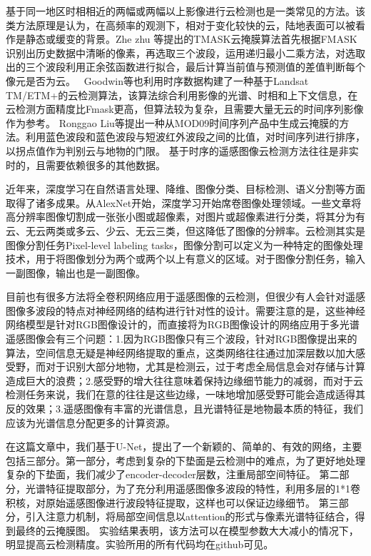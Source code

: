 \documentclass[UTF8]{ctexart}
\begin{document}
基于同一地区时相相近的两幅或两幅以上影像进行云检测也是一类常见的方法。该类方法原理是认为，在高频率的观测下，相对于变化较快的云，陆地表面可以被看作是静态或缓变的背景。Zhe zhu 等\cite{zhu2014automated}提出的TMASK云掩膜算法首先根据FMASK识别出历史数据中清晰的像素，再选取三个波段，运用递归最小二乘方法，对选取出的三个波段利用正余弦函数进行拟合，最后计算当前值与预测值的差值判断每个像元是否为云。 
Goodwin等\cite{goodwin2013cloud}也利用时序数据构建了一种基于Landsat TM/ETM+的云检测算法，该算法综合利用影像的光谱、时相和上下文信息，在云检测方面精度比Fmask更高，但算法较为复杂，且需要大量无云的时间序列影像作为参考。
Ronggao Liu等\cite{liu2013generation}提出一种从MOD09时间序列产品中生成云掩膜的方法。利用蓝色波段和蓝色波段与短波红外波段之间的比值，对时间序列进行排序，以拐点值作为判别云与地物的门限。
基于时序的遥感图像云检测方法往往是非实时的，且需要依赖很多的其他数据。

近年来，深度学习在自然语言处理、降维、图像分类、目标检测、语义分割等方面取得了诸多成果。从AlexNet开始，深度学习开始席卷图像处理领域。一些文章将高分辨率图像切割成一张张小图或超像素，对图片或超像素进行分类，将其分为有云、无云两类或多云、少云、无云三类，但这降低了图像的分辨率。云检测其实是图像分割任务Pixel-level labeling tasks，图像分割可以定义为一种特定的图像处理技术，用于将图像划分为两个或两个以上有意义的区域。对于图像分割任务，输入一副图像，输出也是一副图像。

目前也有很多方法将全卷积网络应用于遥感图像的云检测\cite{chai2019cloud, jeppesen2019cloud}，但很少有人会针对遥感图像多波段的特点对神经网络的结构进行针对性的设计。需要注意的是，这些神经网络模型是针对RGB图像设计的，而直接将为RGB图像设计的网络应用于多光谱遥感图像会有三个问题：1.因为RGB图像只有三个波段，针对RGB图像提出来的算法，空间信息无疑是神经网络提取的重点，这类网络往往通过加深层数以加大感受野，而对于识别大部分地物，尤其是检测云，过于考虑全局信息会对存储与计算造成巨大的浪费；2.感受野的增大往往意味着保持边缘细节能力的减弱，而对于云检测任务来说，我们在意的往往是这些边缘，一味地增加感受野可能会造成适得其反的效果；3.遥感图像有丰富的光谱信息，且光谱特征是地物最本质的特征，我们应该为光谱信息分配更多的计算资源。

在这篇文章中，我们基于U-Net，提出了一个新颖的、简单的、有效的网络，主要包括三部分。第一部分，考虑到复杂的下垫面是云检测中的难点，为了更好地处理复杂的下垫面，我们减少了encoder-decoder层数，注重局部空间特征。
第二部分，光谱特征提取部分，为了充分利用遥感图像多波段的特性，利用多层的1*1卷积核，对原始遥感图像进行波段特征提取，这样也可以保证边缘细节。
第三部分，引入注意力机制，将局部空间信息以attention的形式与像素光谱特征结合，得到最终的云掩膜图。
实验结果表明，该方法可以在模型参数大大减小的情况下，明显提高云检测精度。实验所用的所有代码均在github可见。
\end{document}
